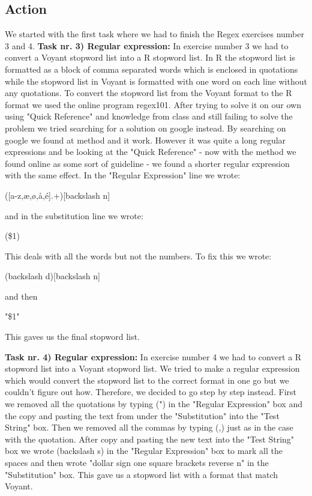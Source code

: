 \documentclass{article}
\begin{document}
\subsection{Action}
We started with the first task where we had to finish the Regex exercises number 3 and 4. \vspace{5mm}
\newline \textbf{Task nr. 3) Regular expression:} \newline 
In exercise number 3 we had to convert a Voyant stopword list into a R stopword list. In R the stopword list is formatted as a block of comma separated words which is enclosed in quotations while the stopword list in Voyant is formatted with one word on each line without any quotations. To convert the stopword list from the Voyant format to the R format we used the online program regex101. After trying to solve it on our own using "Quick Reference" and knowledge from class and still failing to solve the problem we tried searching for a solution on google instead. By searching on google we found at method and it work. However it was quite a long regular expressions and be looking at the "Quick Reference" - now with the method we found online as some sort of guideline - we found a shorter regular expression with the same effect. In the "Regular Expression" line we wrote:
\begin{center}
    ([a-z,æ,ø,å,é].+)[backslash n]
\end{center}
and in the substitution line we wrote:
\begin{center}
    (\$1)
\end{center}
This deals with all the words but not the numbers. To fix this we wrote: 
\begin{center}
    (backslash d)[backslash n]
\end{center}
and then
\begin{center}
    "\$1"
\end{center}
This gaves us the final stopword list. \newline \vspace{5mm}

\textbf{Task nr. 4) Regular expression:} \newline
In exercise number 4 we had to convert a R stopword list into a Voyant stopword list. We tried to make a regular expression which would convert the stopword list to the correct format in one go but we couldn't figure out how. Therefore, we decided to go step by step instead. First we removed all the quotations by typing (") in the "Regular Expression" box and the copy and pasting the text from under the "Substitution" into the "Test String" box. Then we removed all the commas by typing (,) just as in the case with the quotation. After copy and pasting the new text into the "Test String" box we wrote (backslash s) in the "Regular Expression" box to mark all the spaces and then wrote "dollar sign one square brackets reverse n" in the "Substitution" box. This gave us a stopword list with a format that match Voyant.
\end{document}

